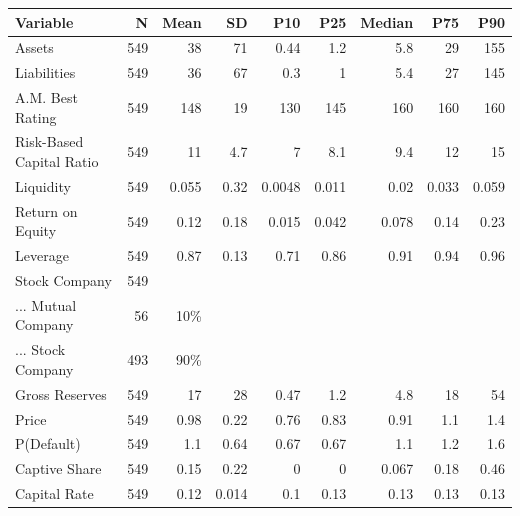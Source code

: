 \begin{tabular}{lrrrrrrrr}
\hline
\hline
Variable & N & Mean & SD & P10 & P25 & Median & P75 & P90 \\ 
\hline
Assets & 549 & 38 & 71 & 0.44 & 1.2 & 5.8 & 29 & 155 \\ 
Liabilities & 549 & 36 & 67 & 0.3 & 1 & 5.4 & 27 & 145 \\ 
A.M. Best Rating & 549 & 148 & 19 & 130 & 145 & 160 & 160 & 160 \\ 
Risk-Based Capital Ratio & 549 & 11 & 4.7 & 7 & 8.1 & 9.4 & 12 & 15 \\ 
Liquidity & 549 & 0.055 & 0.32 & 0.0048 & 0.011 & 0.02 & 0.033 & 0.059 \\ 
Return on Equity & 549 & 0.12 & 0.18 & 0.015 & 0.042 & 0.078 & 0.14 & 0.23 \\ 
Leverage & 549 & 0.87 & 0.13 & 0.71 & 0.86 & 0.91 & 0.94 & 0.96 \\ 
Stock Company & 549 &  &  &  &  &  &  &  \\ 
... Mutual Company & 56 & 10\% &  &  &  &  &  &  \\ 
... Stock Company & 493 & 90\% &  &  &  &  &  &  \\ 
Gross Reserves & 549 & 17 & 28 & 0.47 & 1.2 & 4.8 & 18 & 54 \\ 
Price & 549 & 0.98 & 0.22 & 0.76 & 0.83 & 0.91 & 1.1 & 1.4 \\ 
P(Default) & 549 & 1.1 & 0.64 & 0.67 & 0.67 & 1.1 & 1.2 & 1.6 \\ 
Captive Share & 549 & 0.15 & 0.22 & 0 & 0 & 0.067 & 0.18 & 0.46 \\ 
Capital Rate & 549 & 0.12 & 0.014 & 0.1 & 0.13 & 0.13 & 0.13 & 0.13\\ 
\hline
\hline
\end{tabular}
